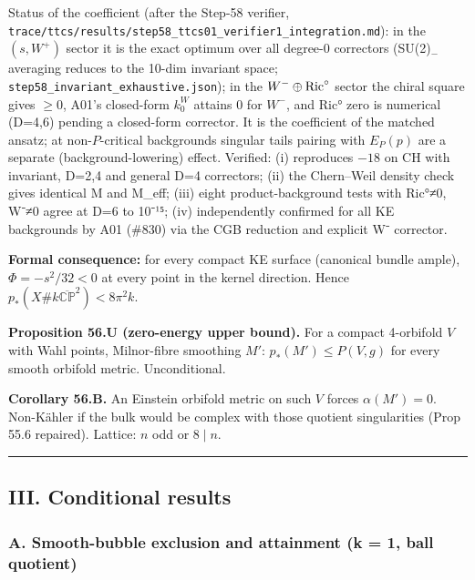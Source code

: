 \documentclass[
  10pt,
]{report}
\begin{document}
Status of the coefficient (after the Step-58 verifier,
\texttt{trace/ttcs/results/step58\_ttcs01\_verifier1\_integration.md}):
in the \((s,W^+)\) sector it is the exact optimum over all degree-0
correctors (SU(2)\(_-\) averaging reduces to the 10-dim invariant space;
\texttt{step58\_invariant\_exhaustive.json}); in the
\(W^-\oplus{\rm Ric}^\circ\) sector the chiral square gives \(\ge0\),
A01's closed-form \(k_0^W\) attains 0 for \(W^-\), and Ric° zero is
numerical (D=4,6) pending a closed-form corrector. It is the coefficient
of the matched ansatz; at non-\(P\)-critical backgrounds singular tails
pairing with \(E_P(p)\) are a separate (background-lowering) effect.
Verified: (i) reproduces \(-18\) on CH with invariant, D=2,4 and general
D=4 correctors; (ii) the Chern--Weil density check gives identical M and
M\_eff; (iii) eight product-background tests with Ric°≠0, W⁻≠0 agree at
D=6 to 10⁻¹⁵; (iv) independently confirmed for all KE backgrounds by A01
(\#830) via the CGB reduction and explicit W⁻ corrector.

\textbf{Formal consequence:} for every compact KE surface (canonical
bundle ample), \(\Phi=-s^2/32<0\) at every point in the kernel
direction. Hence \(p_*(X\#k\overline{\mathbb{CP}}^2)<8\pi^2k\).

\textbf{Proposition 56.U (zero-energy upper bound).} For a compact
4-orbifold \(V\) with Wahl points, Milnor-fibre smoothing \(M'\):
\(p_*(M')\le P(V,g)\) for every smooth orbifold metric. Unconditional.

\textbf{Corollary 56.B.} An Einstein orbifold metric on such \(V\)
forces \(\alpha(M')=0\). Non-Kähler if the bulk would be complex with
those quotient singularities (Prop 55.6 repaired). Lattice: \(n\) odd or
\(8\mid n\).

\begin{center}\rule{0.5\linewidth}{0.5pt}\end{center}

\hypertarget{iii.-conditional-results}{%
\subsection{III. Conditional results}\label{iii.-conditional-results}}

\hypertarget{a.-smooth-bubble-exclusion-and-attainment-k-1-ball-quotient}{%
\subsubsection{A. Smooth-bubble exclusion and attainment (k = 1, ball
quotient)}\label{a.-smooth-bubble-exclusion-and-attainment-k-1-ball-quotient}}
\end{document}
